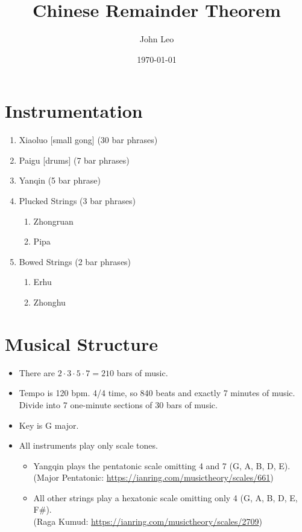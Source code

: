 \documentclass[12pt]{article}
\title{Chinese Remainder Theorem}
\author{John Leo}
\date{\today}
\begin{document}
\maketitle

\section{Instrumentation}

\begin{enumerate}
\item Xiaoluo [small gong] (30 bar phrases)
\item Paigu [drums] (7 bar phrases)
\item Yanqin (5 bar phrase)
\item Plucked Strings (3 bar phrases)
  \begin{enumerate}
  \item Zhongruan
  \item Pipa
  \end{enumerate}
\item Bowed Strings (2 bar phrases)
  \begin{enumerate}
  \item Erhu
  \item Zhonghu
  \end{enumerate}
\end{enumerate}

\section{Musical Structure}

\begin{itemize}
\item There are $2\cdot 3\cdot 5\cdot 7 = 210$ bars of music.

\item Tempo is 120 bpm. 4/4 time, so 840 beats and exactly 7 minutes of music.
Divide into 7 one-minute sections of 30 bars of music.

\item Key is G major.

\item All instruments play only scale tones.

\begin{itemize}
\item Yangqin plays the pentatonic scale omitting 4 and 7 (G, A, B, D, E).
  \\
  (Major Pentatonic: 
\href{https://ianring.com/musictheory/scales/661}{https://ianring.com/musictheory/scales/661})

\item All other strings play a hexatonic scale omitting only 4 (G, A, B, D,
  E, F\#). \\
  (Raga Kumud:
\href{https://ianring.com/musictheory/scales/2709}{https://ianring.com/musictheory/scales/2709})
\end{itemize}
\end{itemize}
\end{document}
